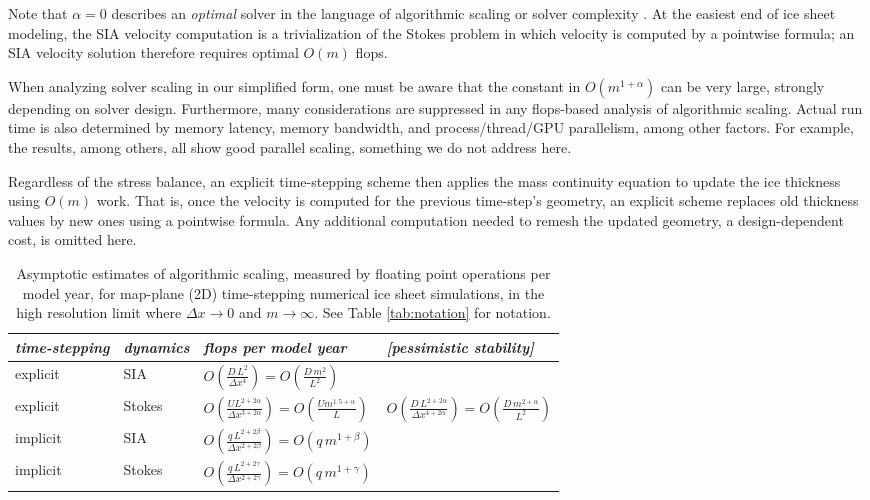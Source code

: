 \documentclass[twocolumn,letterpaper]{igs}
\begin{document}
Note that $\alpha=0$ describes an \emph{optimal} solver in the language of algorithmic scaling or solver complexity \citep{Bueler2021}.  At the easiest end of ice sheet modeling, the SIA velocity computation is a trivialization of the Stokes problem in which velocity is computed by a pointwise formula; an SIA velocity solution therefore requires optimal $O(m)$ flops.

When analyzing solver scaling in our simplified form, one must be aware that the constant in $O(m^{1+\alpha})$ can be very large, strongly depending on solver design.  Furthermore, many considerations are suppressed in any flops-based analysis of algorithmic scaling.  Actual run time is also determined by memory latency, memory bandwidth, and process/thread/GPU parallelism, among other factors.  For example, the \cite{BrownSmithAhmadia2013,Fischleretal2022,IsaacStadlerGhattas2015,Lengetal2012,Tuminaroetal2016} results, among others, all show good parallel scaling, something we do not address here.

Regardless of the stress balance, an explicit time-stepping scheme then applies the mass continuity equation to update the ice thickness using $O(m)$ work.  That is, once the velocity is computed for the previous time-step's geometry, an explicit scheme replaces old thickness values by new ones using a pointwise formula.  Any additional computation needed to remesh the updated geometry, a design-dependent cost, is omitted here.

\newcommand{\oo}[1]{\displaystyle O\left(#1\right)}
\setlength{\tabcolsep}{5pt}
\renewcommand{\arraystretch}{1.5}
\begin{table*}[ht]
{\normalsize
\begin{tabular}{llll}
\emph{time-stepping} & \emph{dynamics} & \emph{flops per model year} & \emph{[pessimistic stability]} \\ \hline
explicit & SIA    & $\oo{\frac{D\, L^2}{\Delta x^4}} = \oo{\frac{D\, m^2}{L^2}}${\Huge \strut} \\
explicit & Stokes & $\oo{\frac{U L^{2+2\alpha}}{\Delta x^{3+2\alpha}}} = \oo{\frac{U m^{1.5+\alpha}}{L}}${\Huge \strut}\phantom{x} & $\oo{\frac{D\, L^{2+2\alpha}}{\Delta x^{4+2\alpha}}} = \oo{\frac{D\,m^{2+\alpha}}{L^2}}$ \\
implicit & SIA    & $\oo{\frac{q\, L^{2+2\beta}}{\Delta x^{2+2\beta}}} = \oo{q\, m^{1+\beta}}${\Huge \strut} \\
implicit & Stokes & $\oo{\frac{q\, L^{2+2\gamma}}{\Delta x^{2+2\gamma}}} = \oo{q\, m^{1+\gamma}}${\Huge \strut}
\end{tabular}
}
\caption{Asymptotic estimates of algorithmic scaling, measured by floating point operations per model year, for map-plane (2D) time-stepping numerical ice sheet simulations, in the high resolution limit where $\Delta x\to 0$ and $m\to\infty$.  See Table \ref{tab:notation} for notation.}
\label{tab:performancemodel}
\end{table*}
\end{document}
